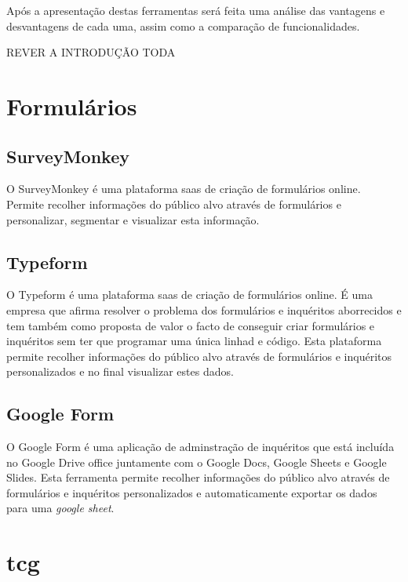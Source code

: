 Após a apresentação destas ferramentas será feita uma análise das vantagens e desvantagens de cada uma, assim como a comparação de funcionalidades.

REVER A INTRODUÇÃO TODA

\section{Formulários}
\label{formulários}

\subsection{SurveyMonkey}
\label{surveyMonkeyM}

O SurveyMonkey é uma plataforma \acrfull{saas} de criação de formulários online. Permite recolher informações do público alvo através de formulários e personalizar, segmentar e visualizar esta informação.



\subsection{Typeform}
\label{typeformM}

O Typeform é uma plataforma \acrshort{saas} de criação de formulários online. É uma empresa que afirma resolver o problema dos formulários e inquéritos aborrecidos e tem também como proposta de valor o facto de conseguir criar formulários e inquéritos sem ter que programar uma única linhad e código. Esta plataforma permite recolher informações do público alvo através de formulários e inquéritos personalizados e no final visualizar estes dados. 



\subsection{Google Form}
\label{googleform}

O Google Form é uma aplicação de adminstração de inquéritos que está incluída no Google Drive office juntamente com o Google Docs\cite{gdocs}, Google Sheets e Google Slides\cite{gslides}. Esta ferramenta permite recolher informações do público alvo através de formulários e inquéritos personalizados e automaticamente exportar os dados para uma \textit{google sheet}.



\section{\acrfull{tcg}}
\label{sec:TCG}

